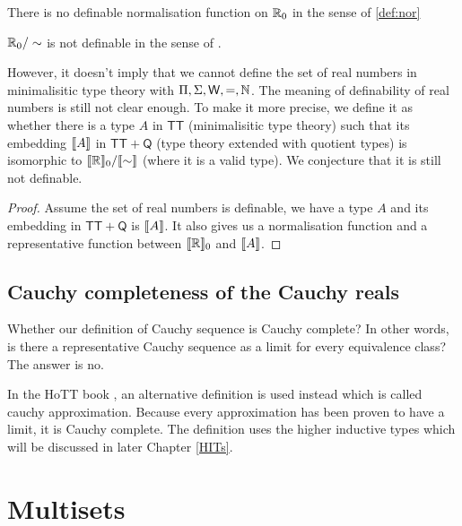 \begin{corollary}
 There is no definable normalisation function on $\mathbb{R}_0$ in the sense
 of \ref{def:nor}
\end{corollary}

\begin{corollary}
 $\mathbb{R}_0 / \sim$ is not definable in the sense of \cite{aan}.
\end{corollary}


However, it doesn't imply that we cannot define the set of real numbers in minimalisitic type theory with $\Pi, \Sigma, \mathsf{W}, =,
\mathbb{N}$. The meaning of definability of real numbers is still not clear enough. To make it more precise, we define
it as whether there is a type $A$ in $\mathsf{TT}$ (minimalisitic type
theory) such that its embedding $\llbracket A\rrbracket$ in $\mathsf{TT} + \mathsf{Q}$ (type theory
extended with quotient types) is isomorphic to $\llbracket \mathbb{R}\rrbracket_0
/ \llbracket \sim\rrbracket$ (where it is a valid type). We conjecture that it is still not
definable.

\begin{proof}
Assume the set of real numbers is definable, we have a type $A$ and
its embedding in $\mathsf{TT} + \mathsf{Q}$  is $\llbracket A\rrbracket$. It also
gives us a normalisation function and a representative function
between $\llbracket \mathbb{R}\rrbracket_0$ and $\llbracket A\rrbracket$.


\end{proof}

\subsection{Cauchy completeness of the Cauchy reals}


Whether our definition of Cauchy sequence is Cauchy complete? In other
words, is there a representative Cauchy sequence as a limit for every
equivalence class? The answer is no.

In the HoTT book \cite{hott}, an alternative definition is used
instead which is called cauchy approximation. Because every
approximation has been proven to have a limit, it is Cauchy complete.
The definition uses the higher inductive types which will be discussed
in later Chapter \ref{HITs}.

\section{Multisets}


